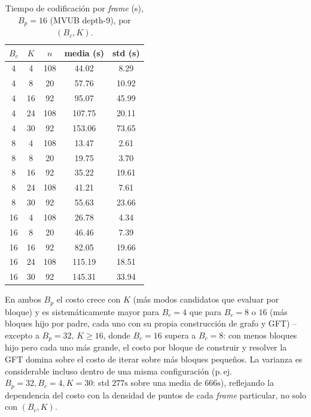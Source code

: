         \begin{table}[H]
            \centering
            \caption{Tiempo de codificación por \textit{frame} (s), $B_p=16$ (MVUB depth-9),
            por $(B_c, K)$.}
            \begin{tabular}{c|c|c|c|c}
                \hline
                $B_c$ & $K$ & $n$ & \textbf{media (s)} & \textbf{std (s)} \\
                \hline
                4  &  4 & 108 &   44.02 &   8.29 \\
                4  &  8 &  20 &   57.76 &  10.92 \\
                4  & 16 &  92 &   95.07 &  45.99 \\
                4  & 24 & 108 &  107.75 &  20.11 \\
                4  & 30 &  92 &  153.06 &  73.65 \\
                \hline
                8  &  4 & 108 &   13.47 &   2.61 \\
                8  &  8 &  20 &   19.75 &   3.70 \\
                8  & 16 &  92 &   35.22 &  19.61 \\
                8  & 24 & 108 &   41.21 &   7.61 \\
                8  & 30 &  92 &   55.63 &  23.66 \\
                \hline
                16 &  4 & 108 &   26.78 &   4.34 \\
                16 &  8 &  20 &   46.46 &   7.39 \\
                16 & 16 &  92 &   82.05 &  19.66 \\
                16 & 24 & 108 &  115.19 &  18.51 \\
                16 & 30 &  92 &  145.31 &  33.94 \\
                \hline
            \end{tabular}
            \label{tab:e10_cost_bp16}
        \end{table}

        En ambos $B_p$ el costo crece con $K$ (más modos candidatos que evaluar por bloque) y es
        sistemáticamente mayor para $B_c=4$ que para $B_c=8$ o $16$ (más bloques hijo por padre,
        cada uno con su propia construcción de grafo y GFT) -- excepto a $B_p=32,\,K\geq16$,
        donde $B_c=16$ supera a $B_c=8$: con menos bloques hijo pero cada uno más grande, el
        costo por bloque de construir y resolver la GFT domina sobre el costo de iterar sobre
        más bloques pequeños. La varianza es considerable incluso dentro de una misma
        configuración (p.\,ej.\ $B_p=32,B_c=4,K=30$: std $277\text{s}$ sobre una media de
        $666\text{s}$), reflejando la dependencia del costo con la densidad de puntos de cada
        \textit{frame} particular, no solo con $(B_c,K)$.

